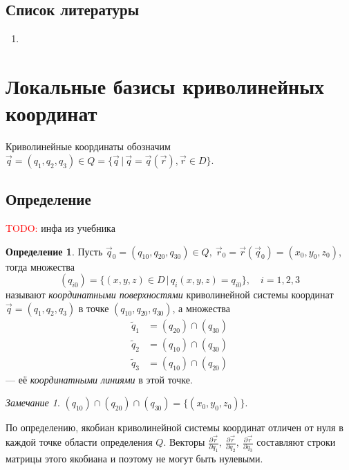\documentclass{article}
\theoremstyle{definition}
\newtheorem{definition}{Определение}[section]
\theoremstyle{plain}
\theoremstyle{remark}
\newtheorem{remark}{Замечание}[section]
\numberwithin{equation}{section}
\newcommand{\parder}[2][]{\frac{\partial #1}{\partial #2}}
\begin{document}
\subsection{Список литературы}
\begin{enumerate}
  \item \cite{lectures}
\end{enumerate}

\pagebreak


\section{Локальные базисы криволинейных координат}

Криволинейные координаты обозначим $\vec{q} = (q_1, q_2, q_3) \in
Q = \{ \vec{q} \, | \, \vec{q} = \vec{q}(\vec{r}), \vec{r} \in D \}$.

\subsection{Определение}

\textcolor{red}{TODO:} инфа из учебника

\begin{definition}
  Пусть $\vec{q}_0 = (q_{10}, q_{20}, q_{30}) \in Q,~\vec{r}_0 =
  \vec{r}(\vec{q}_0) = (x_0, y_0, z_0)$, тогда множества
  \begin{equation}
    (q_{i0}) = \{ (x,y,z) \in D \, | \, q_i(x,y,z) = q_{i0} \}, \quad i = 1,2,3
  \end{equation}
  называют \textit{координатными поверхностями} криволинейной системы координат
  $\vec{q} = (q_1, q_2, q_3)$ в точке $(q_{10}, q_{20}, q_{30})$, а множества
  \begin{equation}
    \begin{aligned}
      \tilde{q}_1 &= (q_{20}) \cap (q_{30}) \\
      \tilde{q}_2 &= (q_{10}) \cap (q_{30}) \\
      \tilde{q}_3 &= (q_{10}) \cap (q_{20})
    \end{aligned}
  \end{equation}
  --- её \textit{координатными линиями} в этой точке.
\end{definition}

\begin{remark}
  $(q_{10}) \cap (q_{20}) \cap (q_{30}) = \{ (x_0, y_0, z_0) \}$.
\end{remark}

По определению, якобиан криволинейной системы координат отличен от нуля в
каждой точке области определения $Q$. Векторы
$\parder[\vec{r}]{q_1},~\parder[\vec{r}]{q_2},~\parder[\vec{r}]{q_3}$
составляют строки матрицы этого якобиана и поэтому не могут быть нулевыми.
\end{document}
